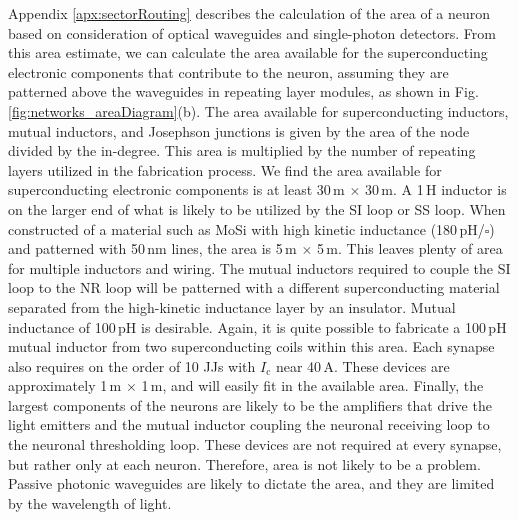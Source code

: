\documentclass[aip,amsmath,amssymb,reprint,nofootinbib]{revtex4-1}
\begin{document}
Appendix \ref{apx:sectorRouting} describes the calculation of the area of a neuron based on consideration of optical waveguides and single-photon detectors. From this area estimate, we can calculate the area available for the superconducting electronic components that contribute to the neuron, assuming they are patterned above the waveguides in repeating layer modules, as shown in Fig.\,\ref{fig:networks_areaDiagram}(b). The area available for superconducting inductors, mutual inductors, and Josephson junctions is given by the area of the node divided by the in-degree. This area is multiplied by the number of repeating layers utilized in the fabrication process. We find the area available for superconducting electronic components is at least 30\,\textmu m $\times$ 30\,\textmu m. A 1\,\textmu H inductor is on the larger end of what is likely to be utilized by the SI loop or SS loop. When constructed of a material such as MoSi with high kinetic inductance (180\,pH/$\square$) and patterned with 50\,nm lines, the area is 5\,\textmu m $\times$ 5\,\textmu m. This leaves plenty of area for multiple inductors and wiring. The mutual inductors required to couple the SI loop to the NR loop will be patterned with a different superconducting material separated from the high-kinetic inductance layer by an insulator. Mutual inductance of 100\,pH is desirable. Again, it is quite possible to fabricate a 100\,pH mutual inductor from two superconducting coils within this area. Each synapse also requires on the order of 10 JJs with $I_{\mathrm{c}}$ near 40\,\textmu A. These devices are approximately 1\,\textmu m $\times$ 1\,\textmu m, and will easily fit in the available area. Finally, the largest components of the neurons are likely to be the amplifiers that drive the light emitters and the mutual inductor coupling the neuronal receiving loop to the neuronal thresholding loop. These devices are not required at every synapse, but rather only at each neuron. Therefore, area is not likely to be a problem. Passive photonic waveguides are likely to dictate the area, and they are limited by the wavelength of light.
\end{document}

